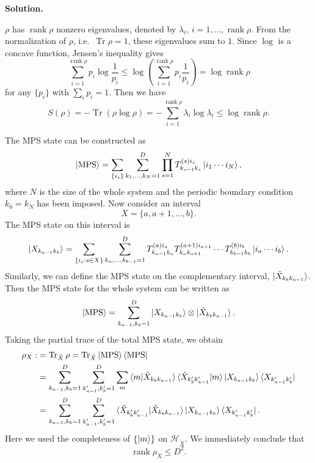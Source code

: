 \documentclass[11pt,a4paper]{article}
\newcounter{problem}
\newcounter{saveequation}
\newenvironment{solution}
{
	\par
	\setcounter{saveequation}{\value{equation}}
	\begingroup
	\setcounter{equation}{0}
	\renewcommand{\theequation}{\arabic{problem}.\arabic{equation}}
	\renewcommand{\theHequation}{sol.\arabic{problem}.\arabic{equation}}
	\noindent\textbf{Solution.}\quad
}
{
	\par
	\endgroup
	\setcounter{equation}{\value{saveequation}}
}
\begin{document}
	\begin{solution}
		$\rho$ has $\operatorname{rank}\rho$ nonzero eigenvalues, denoted by $\lambda_i$, $i=1,\ldots,\operatorname{rank}\rho$. From the normalization of $\rho$, i.e.\ $\operatorname{Tr}\rho=1$, these eigenvalues sum to $1$. Since $\log$ is a concave function, Jensen's inequality gives
		\[
		\sum_{i=1}^{\operatorname{rank}\rho} p_i\log\frac{1}{p_i}
		\leq
		\log\left(
		\sum_{i=1}^{\operatorname{rank}\rho}p_i\frac{1}{p_i}
		\right)
		=
		\log\operatorname{rank}\rho
		\]
		for any $\{p_i\}$ with $\sum_i p_i=1$. Then we have
		\[
		S(\rho)
		=
		-\operatorname{Tr}\left(\rho\log\rho\right)
		=
		-\sum_{i=1}^{\operatorname{rank}\rho}\lambda_i\log\lambda_i
		\leq
		\log\operatorname{rank}\rho.
		\]
		
		The MPS state can be constructed as
		\[
		\ket{\mathrm{MPS}}
		=
		\sum_{\{i_s\}}
		\sum_{k_1,\ldots,k_N=1}^D
		\prod_{s=1}^{N}
		T^{(s)i_s}_{k_{s-1}k_s}
		\ket{i_1\cdots i_N},
		\]
		where $N$ is the size of the whole system and the periodic boundary condition $k_0=k_N$ has been imposed. Now consider an interval
		\[
		X=\{a,a+1,\ldots,b\}.
		\]
		The MPS state on this interval is
		\[
		\ket{X_{k_{a-1}k_b}}
		=
		\sum_{\{i_s:s\in X\}}
		\sum_{k_a,\ldots,k_{b-1}=1}^D
		T^{(a)i_a}_{k_{a-1}k_a}
		T^{(a+1)i_{a+1}}_{k_ak_{a+1}}
		\cdots
		T^{(b)i_b}_{k_{b-1}k_b}
		\ket{i_a\cdots i_b}.
		\]
		Similarly, we can define the MPS state on the complementary interval, $\ket{\tilde{X}_{k_bk_{a-1}}}$. Then the MPS state for the whole system can be written as
		\[
		\ket{\mathrm{MPS}}
		=
		\sum_{k_{a-1},k_b=1}^D
		\ket{X_{k_{a-1}k_b}}
		\otimes
		\ket{\tilde{X}_{k_bk_{a-1}}}.
		\]
		Taking the partial trace of the total MPS state, we obtain
		\[
		\begin{aligned}
			\rho_X:&=\operatorname{Tr}_{\tilde X} \rho
			=
			\operatorname{Tr}_{\tilde X}
			\ket{\mathrm{MPS}}\bra{\mathrm{MPS}}\\
			&=
			\sum_{k_{a-1},k_b=1}^D
			\sum_{k_{a-1}',k_b'=1}^D
			\sum_m
			\braket{m|\tilde{X}_{k_bk_{a-1}}}
			\braket{\tilde{X}_{k_b'k_{a-1}'}|m}
			\ket{X_{k_{a-1}k_b}}
			\bra{X_{k_{a-1}'k_b'}}\\
			&=
			\sum_{k_{a-1},k_b=1}^D
			\sum_{k_{a-1}',k_b'=1}^D
			\braket{
				\tilde{X}_{k_b'k_{a-1}'}
				|
				\tilde{X}_{k_bk_{a-1}}
			}
			\ket{X_{k_{a-1}k_b}}
			\bra{X_{k_{a-1}'k_b'}}.
		\end{aligned}
		\]
		Here we used the completeness of $\{\ket{m}\}$ on $\mathcal{H}_{\tilde X}$. We immediately conclude that
		\[
		\operatorname{rank}\rho_X\leq D^2.
\]
\end{solution}
\end{document}
